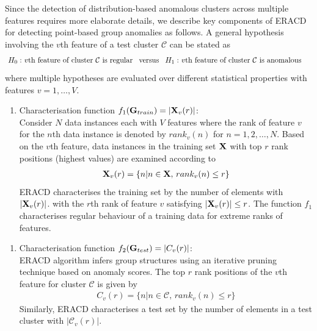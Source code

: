   Since the detection of distribution-based anomalous clusters across multiple features requires more elaborate details, we describe key components of ERACD for detecting point-based group anomalies as follows.  
A general hypothesis involving the $v$th feature of a test cluster $\mathcal{C}$ can be stated as 
\begin{align}
&  \mbox{ $H_0:$  $v$th feature of cluster $\mathcal{C}$ is regular}  \mbox{ \, versus \, $H_1:$  $v$th feature of cluster $\mathcal{C}$ is anomalous   }
\label{Hyp:ERACD} 
\end{align}
where multiple hypotheses are evaluated over different  statistical properties with features $v=1,\dots, V$.  

\begin{enumerate}[1.]
\item Characterisation function $f_1({\bf G}_{train})=|{\bf X}_{v} (r)|$: \\ 
Consider $N$ data instances each with $V$ features where the rank of feature $v$ for the $n$th data instance is denoted by $rank_v(n)$ for $n=1,2,\dots,N$. 
Based on the $v$th feature, data instances in the training set
 $\bf X$ with  top $r$ rank positions (highest values) are examined according to  
\begin{align}
{\bf X}_{v} (r) = \{n |n \in  {\bf X}, \, rank_v(n) \le r \} \label{Eqn:Rank}
\end{align} 
ERACD characterises the training set by the number of elements  with $|{\bf X}_{v} (r)|$. 
with  the $r$th rank  of feature $v$ satisfying   $ | {\bf X }_{v} (r) | \le r$. 
 The function $f_1$ characterises regular behaviour of a training data for  extreme ranks of features.   

\end{enumerate}

\begin{enumerate}[2.]
\item Characterisation function $f_2({\bf G}_{test}) = |{C}_{v} (r)|$: \\ 
ERACD  algorithm infers group structures using an iterative pruning technique based on anomaly scores.  The  top $r$ rank positions of the $v$th feature for cluster $\mathcal{C}$  is given by 
\begin{align}
{C}_{v} (r) = \{n |n \in \mathcal{C}, \, rank_v(n) \le r \} \label{Eqn:Rank}
\end{align} 
Similarly, ERACD characterises a test set by the number of elements in a test cluster   with $|\mathcal{C}_{v} (r)|$. 
\end{enumerate}


